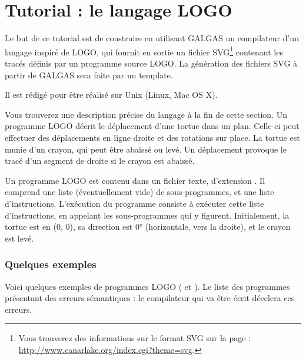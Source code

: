 
\chapter{Tutorial : le langage LOGO}

Le but de ce tutorial est de construire en utilisant GALGAS un compilateur d’un langage inspiré de LOGO, qui fournit en sortie un fichier SVG\footnote{Vous trouverez des informations sur le format SVG sur la page : \url{http://www.canarlake.org/index.cgi?theme=svg}.} contenant les tracés définis par un programme source LOGO. La génération des fichiers SVG à partir de GALGAS sera faite par un template.


Il est rédigé pour être réalisé sur Unix (Linux, Mac OS X).





Vous trouverez une description précise du langage à la fin de cette section. Un programme LOGO décrit le déplacement d'une tortue dans un plan. Celle-ci peut effectuer des déplacements en ligne droite et des rotations sur place. La tortue est munie d'un crayon, qui peut être abaissé ou levé. Un déplacement provoque le tracé d'un segment de droite si le crayon est abaissé.

Un programme LOGO est contenu dans un fichier texte, d'extension . Il comprend une liste (éventuellement vide) de sous-programmes, et une liste d'instructions. L'exécution du programme consiste à exécuter cette liste d'instructions, en appelant les sous-programmes qui y figurent. Initialement, la tortue est en (0, 0), sa direction est 0° (horizontale, vers la droite), et le crayon est levé.


\subsection{Quelques exemples}

Voici quelques exemples de programmes LOGO ( et ). Le  liste des programmes présentant des erreurs sémantiques : le compilateur qui va être écrit décelera ces erreurs.


